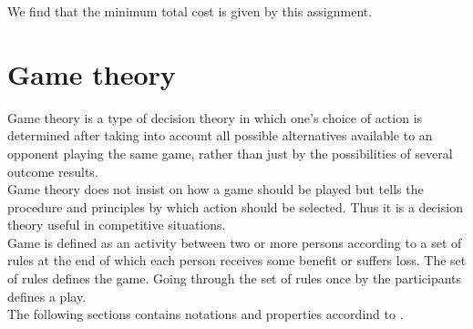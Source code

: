 We find that the minimum total cost is given by this assignment.

\section{Game theory}
Game theory is a type of decision theory in which one’s choice of action is determined after taking
into account all possible alternatives available to an opponent playing the same game, rather than just
by the possibilities of several outcome results. \\
Game theory does not insist on how a game should be played but tells the procedure and principles by which action should be selected.
Thus it is a decision theory useful in competitive situations. \\
Game is defined as an activity between two or more persons according to a set of rules at the end of
which each person receives some benefit or suffers loss. The set of rules defines the game.
Going through the set of rules once by the participants defines a play.
\\

The following sections contains notations and properties accordind to \cite{game_theory:2020}.

